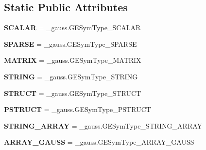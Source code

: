 \subsection*{Static Public Attributes}
\begin{DoxyCompactItemize}
\item 
\hypertarget{classgauss_1_1_g_e_sym_type_ae31670f607a8a7417dc14f5ce73c14d3}{{\bfseries S\-C\-A\-L\-A\-R} = \-\_\-gauss.\-G\-E\-Sym\-Type\-\_\-\-S\-C\-A\-L\-A\-R}\label{classgauss_1_1_g_e_sym_type_ae31670f607a8a7417dc14f5ce73c14d3}

\item 
\hypertarget{classgauss_1_1_g_e_sym_type_ac15124e5639e3765fa941bee6671eb00}{{\bfseries S\-P\-A\-R\-S\-E} = \-\_\-gauss.\-G\-E\-Sym\-Type\-\_\-\-S\-P\-A\-R\-S\-E}\label{classgauss_1_1_g_e_sym_type_ac15124e5639e3765fa941bee6671eb00}

\item 
\hypertarget{classgauss_1_1_g_e_sym_type_a113bf5c4afc006a296fd201f015ad228}{{\bfseries M\-A\-T\-R\-I\-X} = \-\_\-gauss.\-G\-E\-Sym\-Type\-\_\-\-M\-A\-T\-R\-I\-X}\label{classgauss_1_1_g_e_sym_type_a113bf5c4afc006a296fd201f015ad228}

\item 
\hypertarget{classgauss_1_1_g_e_sym_type_ae7214c2797b0e24b698a83312458f114}{{\bfseries S\-T\-R\-I\-N\-G} = \-\_\-gauss.\-G\-E\-Sym\-Type\-\_\-\-S\-T\-R\-I\-N\-G}\label{classgauss_1_1_g_e_sym_type_ae7214c2797b0e24b698a83312458f114}

\item 
\hypertarget{classgauss_1_1_g_e_sym_type_ae88924204bad707c2003e4e40c8a6457}{{\bfseries S\-T\-R\-U\-C\-T} = \-\_\-gauss.\-G\-E\-Sym\-Type\-\_\-\-S\-T\-R\-U\-C\-T}\label{classgauss_1_1_g_e_sym_type_ae88924204bad707c2003e4e40c8a6457}

\item 
\hypertarget{classgauss_1_1_g_e_sym_type_a8e546543d4c32a8361e63e65f1fa195c}{{\bfseries P\-S\-T\-R\-U\-C\-T} = \-\_\-gauss.\-G\-E\-Sym\-Type\-\_\-\-P\-S\-T\-R\-U\-C\-T}\label{classgauss_1_1_g_e_sym_type_a8e546543d4c32a8361e63e65f1fa195c}

\item 
\hypertarget{classgauss_1_1_g_e_sym_type_a9d68ae58bbc4ec2885300731788c6043}{{\bfseries S\-T\-R\-I\-N\-G\-\_\-\-A\-R\-R\-A\-Y} = \-\_\-gauss.\-G\-E\-Sym\-Type\-\_\-\-S\-T\-R\-I\-N\-G\-\_\-\-A\-R\-R\-A\-Y}\label{classgauss_1_1_g_e_sym_type_a9d68ae58bbc4ec2885300731788c6043}

\item 
\hypertarget{classgauss_1_1_g_e_sym_type_a2db20ee94943b1d30dab31e749d4c534}{{\bfseries A\-R\-R\-A\-Y\-\_\-\-G\-A\-U\-S\-S} = \-\_\-gauss.\-G\-E\-Sym\-Type\-\_\-\-A\-R\-R\-A\-Y\-\_\-\-G\-A\-U\-S\-S}\label{classgauss_1_1_g_e_sym_type_a2db20ee94943b1d30dab31e749d4c534}


\end{DoxyCompactItemize}
